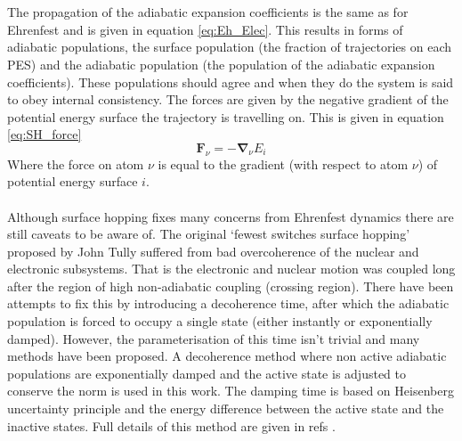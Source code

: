 \\\\
The propagation of the adiabatic expansion coefficients is the same as for Ehrenfest and is given in equation \eqref{eq:Eh_Elec}. This results in  forms of adiabatic populations, the surface population (the fraction of trajectories on each PES) and the adiabatic population (the population of the adiabatic expansion coefficients). These  populations should agree and when they do the system is said to obey internal consistency. The forces are given by the negative gradient of the potential energy surface the trajectory is travelling on. This is given in equation \eqref{eq:SH_force}
\begin{equation}
	\mathbf{F}_{\nu} = -\mathbf{\nabla}_{\nu} E_{i} 
  \label{eq:SH_force}
\end{equation}
Where the force on atom $\nu$ is equal to the gradient (with respect to atom $\nu$) of potential energy surface $i$.
\\\\
Although surface hopping fixes many concerns from Ehrenfest dynamics there are still caveats to be aware of. The original `fewest switches surface hopping' proposed by John Tully suffered from bad overcoherence of the nuclear and electronic subsystems. That is the electronic and nuclear motion was coupled long after the region of high non-adiabatic coupling (crossing region). There have been attempts to fix this by introducing a decoherence time, after which the adiabatic population is forced to occupy a single state (either instantly or exponentially damped). However, the parameterisation of this time isn't trivial and many methods have been proposed. A decoherence method where non active adiabatic populations are exponentially damped and the active state is adjusted to conserve the norm is used in this work. The damping time is based on Heisenberg uncertainty principle and the energy difference between the active state and the inactive states. Full details of this method are given in refs \cite{Giannini2018Crossover, Carof2017FSSH}.
\\\\
